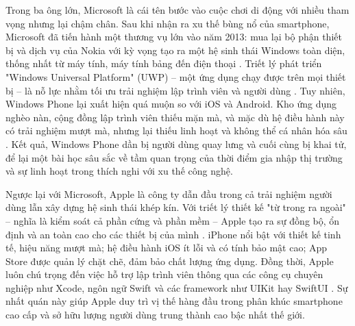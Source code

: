     \begin{flushleft}
      \hspace*{0.8cm}Trong ba ông lớn, Microsoft là cái tên bước vào cuộc chơi di động với nhiều tham vọng nhưng lại chậm chân. Sau khi nhận ra xu thế bùng nổ của smartphone, Microsoft đã tiến hành một thương vụ lớn vào năm 2013: mua lại bộ phận thiết bị và dịch vụ của Nokia với kỳ vọng tạo ra một hệ sinh thái Windows toàn diện, thống nhất từ máy tính, máy tính bảng đến điện thoại \cite{msft-nokia}. Triết lý phát triển "Windows Universal Platform" (UWP) – một ứng dụng chạy được trên mọi thiết bị – là nỗ lực nhằm tối ưu trải nghiệm lập trình viên và người dùng \cite{uwp-overview}. Tuy nhiên, Windows Phone lại xuất hiện quá muộn so với iOS và Android. Kho ứng dụng nghèo nàn, cộng đồng lập trình viên thiếu mặn mà, và mặc dù hệ điều hành này có trải nghiệm mượt mà, nhưng lại thiếu linh hoạt và không thể cá nhân hóa sâu \cite{windows-phone-fail}. Kết quả, Windows Phone dần bị người dùng quay lưng và cuối cùng bị khai tử, để lại một bài học sâu sắc về tầm quan trọng của thời điểm gia nhập thị trường và sự linh hoạt trong thích nghi với xu thế công nghệ.
    \end{flushleft}

    \begin{flushleft}
      \hspace*{0.8cm}Ngược lại với Microsoft, Apple là công ty dẫn đầu trong cả trải nghiệm người dùng lẫn xây dựng hệ sinh thái khép kín. Với triết lý thiết kế "từ trong ra ngoài" – nghĩa là kiểm soát cả phần cứng và phần mềm – Apple tạo ra sự đồng bộ, ổn định và an toàn cao cho các thiết bị của mình \cite{apple-ecosystem}. iPhone nổi bật với thiết kế tinh tế, hiệu năng mượt mà; hệ điều hành iOS ít lỗi và có tính bảo mật cao; App Store được quản lý chặt chẽ, đảm bảo chất lượng ứng dụng. Đồng thời, Apple luôn chú trọng đến việc hỗ trợ lập trình viên thông qua các công cụ chuyên nghiệp như Xcode, ngôn ngữ Swift và các framework như UIKit hay SwiftUI \cite{apple-devtools}. Sự nhất quán này giúp Apple duy trì vị thế hàng đầu trong phân khúc smartphone cao cấp và sở hữu lượng người dùng trung thành cao bậc nhất thế giới.
    \end{flushleft}


